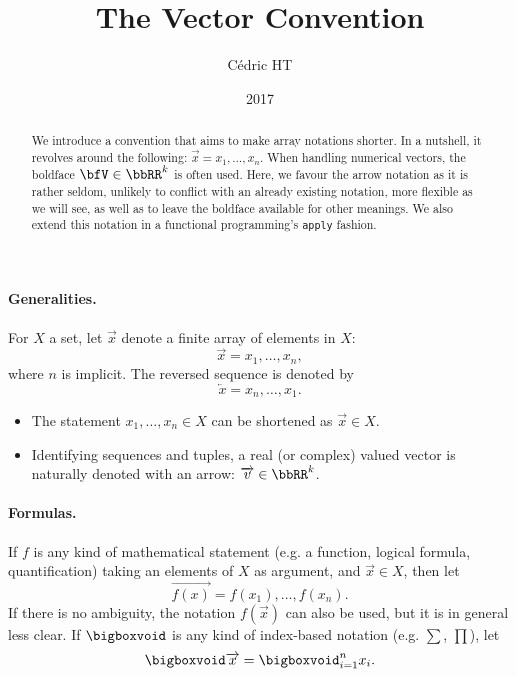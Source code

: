 \documentclass[a4paper, 8pt]{article}
\title{The Vector Convention}
\author{Cédric HT}
\date{2017}
\begin{document}
\begin{multicols}{2}

\maketitle

\begin{abstract}
	We introduce a convention that aims to make array notations shorter. In a nutshell, it revolves around the following: $\overrightarrow{x} = x_1, \ldots, x_n$. When handling numerical vectors, the boldface $\bfV \in \bbRR^k$ is often used. Here, we favour the arrow notation as it is rather seldom, unlikely to conflict with an already existing notation, more flexible as we will see, as well as to leave the boldface available for other meanings. We also extend this notation in a functional programming's \texttt{apply} fashion.
\end{abstract}

\paragraph{Generalities.} For $X$ a set, let $\overrightarrow{x}$ denote a finite array of elements in $X$:
\[ \overrightarrow{x} = x_1, \ldots, x_n, \]
where $n$ is implicit. The reversed sequence is denoted by
\[ \overleftarrow{x} = x_n, \ldots, x_1 . \]

\begin{examples*}
	\begin{itemize}
		\item The statement $x_1, \ldots, x_n \in X$ can be shortened as $\overrightarrow{x} \in X$.
		\item Identifying sequences and tuples, a real (or complex) valued vector is naturally denoted with an arrow: $\overrightarrow{v} \in \bbRR^k$.
	\end{itemize}
\end{examples*}

\paragraph{Formulas.} If $f$ is any kind of mathematical statement (e.g. a function, logical formula, quantification) taking an elements of $X$ as argument, and $\overrightarrow{x} \in X$, then let
\[ \overrightarrow{f (x)} = f (x_1), \ldots, f (x_n) . \]
If there is no ambiguity, the notation $f (\overrightarrow{x})$ can also be used, but it is in general less clear. If $\bigboxvoid$ is any kind of index-based notation (e.g. $\sum$, $\prod$), let
\[ \bigboxvoid \overrightarrow{x} = \bigboxvoid_{i = 1}^n x_i . \]


\end{multicols}
\end{document}
